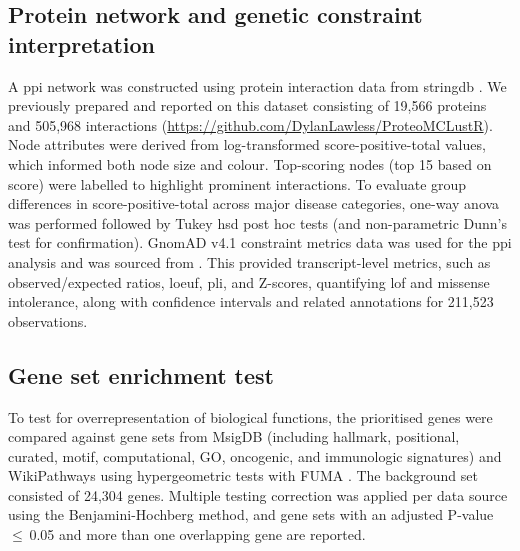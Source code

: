 \subsection{Protein network and genetic constraint interpretation}
A \ac{ppi} network was constructed using protein interaction data from \ac{stringdb} \cite{szklarczyk2025string}. We previously prepared and reported 
on this dataset consisting of 19,566 proteins and 505,968 interactions 
(\url{https://github.com/DylanLawless/ProteoMCLustR}).
Node attributes were derived from log-transformed score-positive-total values, which informed both node size and colour. Top-scoring nodes (top 15 based on score) were labelled to highlight prominent interactions. To evaluate group differences in score-positive-total across major disease categories, one-way \ac{anova} was performed followed by Tukey \ac{hsd} post hoc tests (and non-parametric Dunn’s test for confirmation). 
GnomAD v4.1 constraint metrics data was used for the \ac{ppi} analysis and was sourced from \citet{karczewski2020mutational}.
This provided transcript-level metrics, such as observed/expected ratios, \ac{loeuf}, \ac{pli}, and Z-scores, quantifying \ac{lof} and missense intolerance, along with confidence intervals and related annotations for 211,523 observations.

\subsection{Gene set enrichment test}

To test for overrepresentation of biological functions, the prioritised genes were compared against gene sets from MsigDB (including hallmark, positional, curated, motif, computational, GO, oncogenic, and immunologic signatures) and WikiPathways using hypergeometric tests with FUMA \cite{watanabe_functional_2017, liberzon_molecular_2011}.
The background set consisted of 24,304 genes. Multiple testing correction was applied per data source using the Benjamini-Hochberg method, and gene sets with an adjusted P-value $\le$ 0.05 and more than one overlapping gene are reported.


